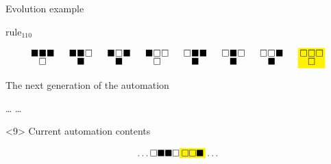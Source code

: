 \documentclass[presentation,aspectratio=169,smaller]{beamer}
\begin{document}
\begin{frame}[label={sec:org3545853},t]{Evolution example}
\begin{onlyenv}
\(\text{rule}_{110}\)

\begin{equation*}
  \begingroup
  \setlength\arraycolsep{0.25pt}
  \renewcommand{\arraystretch}{0.5}
  \begin{matrix}
    \blacksquare & \blacksquare & \blacksquare \\
    & \square &
  \end{matrix}\mspace{28mu}
  \begin{matrix}
    \blacksquare & \blacksquare & \square \\
    & \blacksquare &
  \end{matrix}\mspace{28mu}
  \begin{matrix}
    \blacksquare & \square & \blacksquare \\
    & \blacksquare &
  \end{matrix}\mspace{28mu}
  \begin{matrix}
    \blacksquare & \square & \square \\
    & \square &
  \end{matrix}\mspace{28mu}
  \begin{matrix}
    \square & \blacksquare & \blacksquare \\
    & \blacksquare &
  \end{matrix}\mspace{28mu}
  \begin{matrix}
    \square & \blacksquare & \square \\
    & \blacksquare &
  \end{matrix}\mspace{28mu}
  \begin{matrix}
    \square & \square & \blacksquare \\
    & \blacksquare &
  \end{matrix}\mspace{28mu}
  \mathcolorbox{yellow}{
    \begin{matrix}
      \square & \square & \square \\
      & \square &
    \end{matrix}
  }
  \endgroup
\end{equation*}

The next generation of the automation

\hfill \dots
\blacksquare
\blacksquare
\blacksquare
\square
{}
\mspace{14mu}
\mspace{14mu}
\dots \hfill
\end{onlyenv}

\begin{onlyenv}<9>
Current automation contents

\begin{equation*}
  \hfill
  \dots
  \square
  \blacksquare
  \blacksquare
  \square
  \mathcolorbox{yellow}{
    \square
    \square
    \blacksquare
  }
  \dots
  \hfill
\end{equation*}


\end{onlyenv}
\end{frame}
\end{document}
